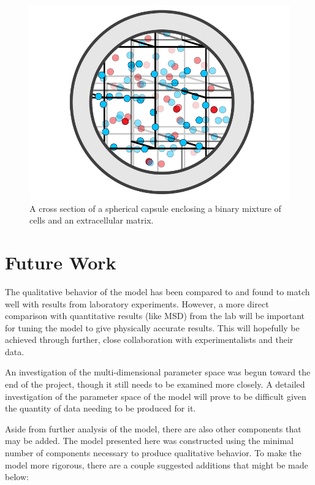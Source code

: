 \documentclass[aps,prb,twocolumn,groupedaddress,nofootinbib,floatfix]{revtex4}
\begin{document}
\begin{figure}
  \includegraphics[width=0.9\columnwidth]{images/Fig2.png}
  \caption[capsuleECM]
   {A cross section of a spherical capsule enclosing a binary mixture of cells and an extracellular matrix.}
   \label{fig:capsuleECM}
\end{figure}


\section{Future Work}

The qualitative behavior of the model has been compared to and found to match well with results from laboratory experiments.
However, a more direct comparison with quantitative results (like MSD) from the lab will be important for tuning the model to give physically accurate results.
This will hopefully be achieved through further, close collaboration with experimentalists and their data.

An investigation of the multi-dimensional parameter space was begun toward the end of the project, though it still needs to be examined more closely.
A detailed investigation of the parameter space of the model will prove to be difficult given the quantity of data needing to be produced for it.

Aside from further analysis of the model, there are also other components that may be added.
The model presented here was constructed using the minimal number of components necessary to produce qualitative behavior.
To make the model more rigorous, there are a couple suggested additions that might be made below:
\end{document}
